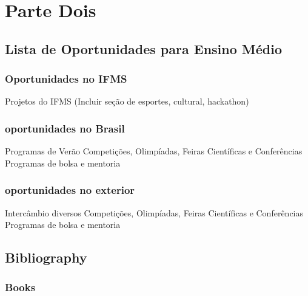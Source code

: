 \documentclass[11pt,fleqn]{book} %
\begin{document}
\part{Parte Dois}



\chapter{Lista de Oportunidades para Ensino Médio}

\section{Oportunidades no IFMS}

Projetos do IFMS (Incluir seção de esportes, cultural, hackathon)


\section{oportunidades no Brasil}
Programas de Verão
Competições, Olimpíadas, Feiras Científicas e Conferências
Programas de bolsa e mentoria


\section{oportunidades no exterior}
Intercâmbio diversos
Competições, Olimpíadas, Feiras Científicas e Conferências
Programas de bolsa e mentoria


\chapter*{Bibliography}
\section*{Books}
\printbibliography[heading=bibempty,type=book]
\end{document}
